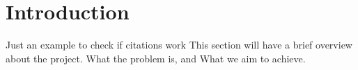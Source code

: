 \chapter{Introduction}
	Just an example to check if citations work \cite{franklin2007inquiry}
	This section will have a brief overview about the project. What the problem is, and What we aim to achieve.

